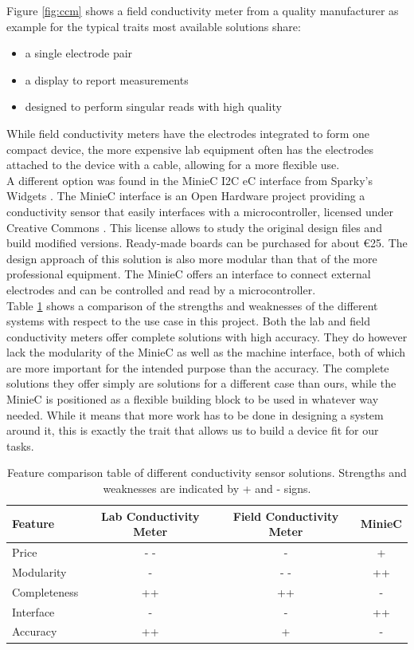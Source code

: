 Figure \ref{fig:ccm} shows a field conductivity meter from a quality manufacturer as example for the typical traits most available solutions share:
\begin{itemize}
	\item a single electrode pair
	\item a display to report measurements
	\item designed to perform singular reads with high quality
\end{itemize}

While field conductivity meters have the electrodes integrated to form one compact device, the more expensive lab equipment often has the electrodes attached to the device with a cable, allowing for a more flexible use.\\

A different option was found in the MinieC I2C eC interface from Sparky's Widgets \parencite{uec}. The MinieC interface is an Open Hardware project providing a conductivity sensor that easily interfaces with a microcontroller, licensed under Creative Commons \parencite{cc}. This license allows to study the original design files and build modified versions. Ready-made boards can be purchased for about \euro{25}. The design approach of this solution is also more modular than that of the more professional equipment. The MinieC offers an interface to connect external electrodes and can be controlled and read by a microcontroller.\\

Table \ref{tab:feat} shows a comparison of the strengths and weaknesses of the different systems with respect to the use case in this project. Both the lab and field conductivity meters offer complete solutions with high accuracy. They do however lack the modularity of the MinieC as well as the machine interface, both of which are more important for the intended purpose than the accuracy. The complete solutions they offer simply are solutions for a different case than ours, while the MinieC is positioned as a flexible building block to be used in whatever way needed. While it means that more work has to be done in designing a system around it, this is exactly the trait that allows us to build a device fit for our tasks.

\begin{table}[H]
    \centering

    \caption[]{Feature comparison table of different conductivity sensor solutions. Strengths and weaknesses are indicated by + and - signs.}
    \label{tab:feat}
    \begin{tabular}{l  c  c  c}
        	\toprule
         Feature & Lab Conductivity Meter & Field Conductivity Meter & MinieC \\
        	\midrule
		Price & - - & - & + \\
		Modularity & - & - - & ++ \\
		Completeness & ++ & ++ & - \\
		Interface & - & - & ++ \\
		Accuracy & ++ & + & - \\
        \bottomrule
    \end{tabular}
\end{table}